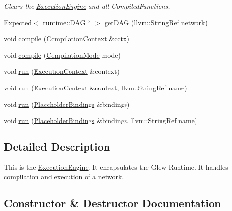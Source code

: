 \begin{DoxyCompactItemize}
\begin{DoxyCompactList}\small\item\em Clears the \hyperlink{classglow_1_1_execution_engine}{Execution\+Engine} and all Compiled\+Functions. \end{DoxyCompactList}\item 
\hyperlink{classglow_1_1detail_1_1_glow_expected}{Expected}$<$ \hyperlink{structglow_1_1runtime_1_1_d_a_g}{runtime\+::\+D\+AG} $\ast$ $>$ \hyperlink{classglow_1_1_execution_engine_a01943b9b5b551fe72e0bdb6e5ca84103}{get\+D\+AG} (llvm\+::\+String\+Ref network)
\item 
void \hyperlink{classglow_1_1_execution_engine_aba8c48da8a7a8868a4d42128ac2f05fe}{compile} (\hyperlink{structglow_1_1_compilation_context}{Compilation\+Context} \&cctx)
\item 
void \hyperlink{classglow_1_1_execution_engine_a5a719c4411a5c8389e7bf656e37a7602}{compile} (\hyperlink{structglow_1_1_compilation_context_a92efb87746c0edf7756b84fdcd87014a}{Compilation\+Mode} mode)
\item 
void \hyperlink{classglow_1_1_execution_engine_ac923edda3691d2560632616145c3175f}{run} (\hyperlink{classglow_1_1_execution_context}{Execution\+Context} \&context)
\item 
void \hyperlink{classglow_1_1_execution_engine_a52453e762a5843e7727cdb83c32422ee}{run} (\hyperlink{classglow_1_1_execution_context}{Execution\+Context} \&context, llvm\+::\+String\+Ref name)
\item 
void \hyperlink{classglow_1_1_execution_engine_a4d13189ef64dea65a581caf4a9b88978}{run} (\hyperlink{classglow_1_1_placeholder_bindings}{Placeholder\+Bindings} \&bindings)
\item 
void \hyperlink{classglow_1_1_execution_engine_aad11bc4c7de37155ee0f29d787d0da31}{run} (\hyperlink{classglow_1_1_placeholder_bindings}{Placeholder\+Bindings} \&bindings, llvm\+::\+String\+Ref name)
\end{DoxyCompactItemize}


\subsection{Detailed Description}
This is the \hyperlink{classglow_1_1_execution_engine}{Execution\+Engine}. It encapsulates the Glow Runtime. It handles compilation and execution of a network. 

\subsection{Constructor \& Destructor Documentation}
\mbox{\label{classglow_1_1_execution_engine_ad438cf3b34468a43b1d62cf1975635e0}} 
